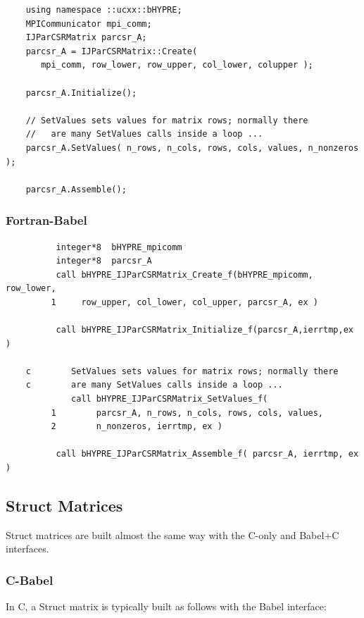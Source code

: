 \begin{verbatim}
    using namespace ::ucxx::bHYPRE;
    MPICommunicator mpi_comm;
    IJParCSRMatrix parcsr_A;
    parcsr_A = IJParCSRMatrix::Create(
       mpi_comm, row_lower, row_upper, col_lower, colupper );

    parcsr_A.Initialize();

    // SetValues sets values for matrix rows; normally there
    //   are many SetValues calls inside a loop ...
    parcsr_A.SetValues( n_rows, n_cols, rows, cols, values, n_nonzeros );

    parcsr_A.Assemble();
\end{verbatim}


\subsubsection{Fortran-Babel}
\begin{verbatim}
          integer*8  bHYPRE_mpicomm
          integer*8  parcsr_A
          call bHYPRE_IJParCSRMatrix_Create_f(bHYPRE_mpicomm, row_lower,
         1     row_upper, col_lower, col_upper, parcsr_A, ex )

          call bHYPRE_IJParCSRMatrix_Initialize_f(parcsr_A,ierrtmp,ex )

    c        SetValues sets values for matrix rows; normally there
    c        are many SetValues calls inside a loop ...
             call bHYPRE_IJParCSRMatrix_SetValues_f(
         1        parcsr_A, n_rows, n_cols, rows, cols, values,
         2        n_nonzeros, ierrtmp, ex )

          call bHYPRE_IJParCSRMatrix_Assemble_f( parcsr_A, ierrtmp, ex )
\end{verbatim}



\subsection{Struct Matrices}

Struct matrices are built almost the same way with
the C-only and Babel+C interfaces.

\subsubsection{C-Babel}

In C, a Struct  matrix is typically built as follows with
the Babel interface:

